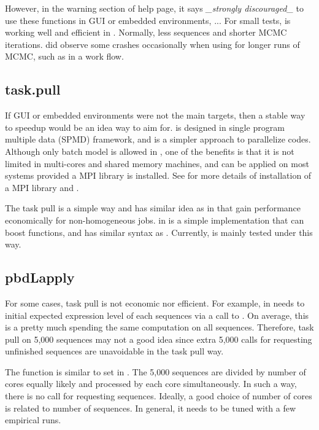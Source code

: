However, in the warning section of  help page, it says
{\it \_strongly discouraged\_} to use these functions in GUI or embedded
environments, ...
For small tests,  is working well and efficient
in . Normally, less sequences and shorter MCMC iterations.
 did observe some crashes occasionally
when using  for longer runs of MCMC, such as in a
work flow.


\subsection[task.pull]{task.pull}
\label{sec:task.pull}

If GUI or embedded environments were not the main targets, then a stable way
to speedup  would be an idea way to aim for.
 is designed in single program multiple data (SPMD) framework,
and is a simpler approach to parallelize codes.
Although only batch model is allowed in ,
one of the benefits is that it is not limited in multi-cores and
shared memory machines, and can be applied on most systems provided a
MPI library is installed.
See \citet{Chen2012pbdMPIvignette} for more details of installation of a
MPI library and .

The task pull is a simple way and has similar idea as
 in  that gain
performance economically for non-homogeneous jobs.
 in  is a simple implementation that can boost
 functions, and has similar syntax as .
Currently,  is mainly tested under this way.


\subsection[pbdLapply]{pbdLapply}
\label{sec:pbdLapply}

For some cases, task pull is not economic nor efficient. For example, in
 needs to initial expected expression level of each sequences
via a call to . On average, this is a pretty much
spending the same computation on all sequences. Therefore, task pull on 5,000
sequences may not a good idea since extra 5,000 calls for requesting unfinished
sequences are unavoidable in the task pull way.

The function  is similar to set 
in . The 5,000 sequences are divided by number of cores equally
likely and processed by each core simultaneously. In such a way, there is no
call for requesting sequences. Ideally, a good choice of number of cores
is related to number of sequences. In general, it needs to be tuned with a
few empirical runs.

